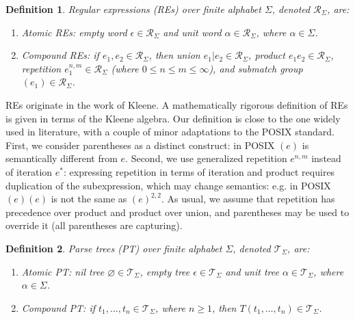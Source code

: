 \documentclass[AMA,STIX1COL]{WileyNJD-v2}
\newcommand{\XE}{\mathcal{E}}
\newcommand{\XR}{\mathcal{R}}
\newcommand{\XT}{\mathcal{T}}
\newtheorem{Xdef}{Definition}
\begin{document}
    \begin{Xdef}
    \emph{Regular expressions (REs)} over finite alphabet $\Sigma$, denoted $\XR_\Sigma$, are:
    \begin{enumerate}
        \item Atomic REs:
          \emph{empty word} $\epsilon \in \XR_\Sigma$ and
          \emph{unit word} $\alpha \in \XR_\Sigma$, where $\alpha \in \Sigma$.
        \item Compound REs: if $e_1, e_2 \in \XR_\Sigma$, then
          \emph{union} $e_1 | e_2 \in \XR_\Sigma$,
          \emph{product} $e_1 e_2 \in \XR_\Sigma$,
          \emph{repetition} $e_1^{n, m} \in \XR_\Sigma$ (where $0 \leq n \leq m \leq \infty$), and
          \emph{submatch group} $(e_1) \in \XR_\Sigma$.
    \end{enumerate}
    \end{Xdef}

REs originate in the work of Kleene\cite{Kle51}.
A mathematically rigorous definition of REs is given in terms of the Kleene algebra\cite{Koz94}.
Our definition is close to the one widely used in literature\cite{HU90}\cite{SS88},
with a couple of minor adaptations to the POSIX standard.
First, we consider parentheses as a distinct construct: in POSIX $(e)$ is semantically different from $e$.
Second, we use generalized repetition $e^{n, m}$ instead of iteration $e^*$:
expressing repetition in terms of iteration and product requires duplication of the subexpression,
which may change semantics: e.g. in POSIX $(e)(e)$ is not the same as $(e)^{2,2}$.
As usual, we assume that repetition has precedence over product and product over union,
and parentheses may be used to override it (all parentheses are capturing).

    \begin{Xdef}
    \emph{Parse trees (PT)} over finite alphabet $\Sigma$, denoted $\XT_\Sigma$, are:
    \begin{enumerate}
        \item Atomic PT:
          \emph{nil tree} ${\varnothing} \in \XT_\Sigma$,
          \emph{empty tree} ${\epsilon} \in \XT_\Sigma$ and
          \emph{unit tree} ${\alpha} \in \XT_\Sigma$, where $\alpha \in \Sigma$.
        \item Compound PT: if $t_1, \dots, t_n \in \XT_\Sigma$, where $n \geq 1$, then
          ${T}(t_1, \dots, t_n) \in \XT_\Sigma$.
    \end{enumerate}
    \end{Xdef}
\end{document}
